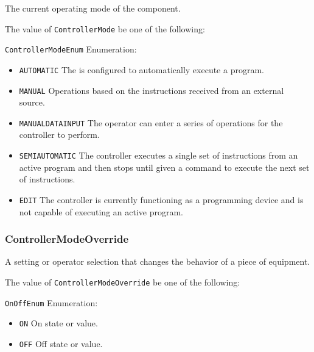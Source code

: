 The current operating mode of the  component.


The value of \texttt{ControllerMode} \MUST be one of the following: 


\texttt{ControllerModeEnum} Enumeration:

\begin{itemize}
\item \texttt{AUTOMATIC} \newline The  is configured to automatically execute a program. 
\item \texttt{MANUAL} \newline Operations based on the instructions received from an external source. 
\item \texttt{MANUAL\textunderscore DATA\textunderscore INPUT} \newline The operator can enter a series of operations for the controller to perform. 
\item \texttt{SEMI\textunderscore AUTOMATIC} \newline The controller  executes a single set of instructions from an active program and then stops until given a command to execute the next set of instructions. 
\item \texttt{EDIT} \newline The controller is currently functioning as a programming device and is not capable of executing an active program. 
\end{itemize}

\FloatBarrier

\subsubsection{ControllerModeOverride}
\label{sec:ControllerModeOverride}



A setting or operator selection that changes the behavior of a piece of equipment.


The value of \texttt{ControllerModeOverride} \MUST be one of the following: 


\texttt{OnOffEnum} Enumeration:

\begin{itemize}
\item \texttt{ON} \newline On state or value. 
\item \texttt{OFF} \newline Off state or value. 
\end{itemize}

